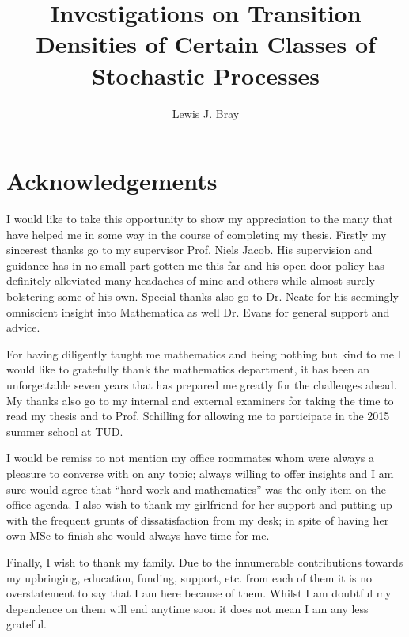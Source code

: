 \documentclass[a4paper, 12pt]{report}
\theoremstyle{cor}
\theoremstyle{remark}
\theoremstyle{definition}
\begin{document}
\title{Investigations on Transition Densities of Certain Classes of Stochastic Processes}
\author{Lewis J. Bray}

\maketitle

\thispagestyle{empty}\null\newpage


\chapter*{Acknowledgements}

I would like to take this opportunity to show my appreciation to the many that have helped me in some way in the course of completing my thesis.  Firstly my sincerest thanks go to my supervisor Prof. Niels Jacob.  His supervision and guidance has in no small part gotten me this far and his open door policy has definitely alleviated many headaches of mine and others while almost surely bolstering some of his own.  Special thanks also go to Dr. Neate for his seemingly omniscient insight into Mathematica as well Dr. Evans for general support and advice.

For having diligently taught me mathematics and being nothing but kind to me I would like to gratefully thank the mathematics department, it has been an unforgettable seven years that has prepared me greatly for the challenges ahead.  My thanks also go to my internal and external examiners for taking the time to read my thesis and to Prof. Schilling for allowing me to participate in the 2015 summer school at TUD.

I would be remiss to not mention my office roommates whom were always a pleasure to converse with on any topic; always willing to offer insights and I am sure would agree that “hard work and mathematics” was the only item on the office agenda.  I also wish to thank my girlfriend for her support and putting up with the frequent grunts of dissatisfaction from my desk; in spite of having her own MSc to finish she would always have time for me.

Finally, I wish to thank my family.  Due to the innumerable contributions towards my upbringing, education, funding, support, etc. from each of them it is no overstatement to say that I am here because of them.  Whilst I am doubtful my dependence on them will end anytime soon it does not mean I am any less grateful.
\end{document}
